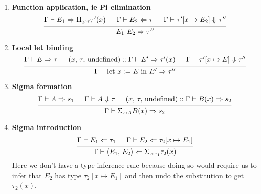 \documentclass{article}
\begin{document}
\begin{definition} 
\begin{enumerate}
    \[
      \begin{prooftree}
        \hypo{\Gamma \vdash T \Rightarrow s}
        \hypo{\Gamma \vdash T \Downarrow \tau}
        \hypo{(x, \, \tau, \, \text{undefined}) :: \Gamma \vdash E \Rightarrow \tau'(x)}
        \infer3{\Gamma \vdash \lambda \, (x : T), \, E \Rightarrow \Pi_{x : \tau}\tau'(x)}
      \end{prooftree}
    \]
    The second rule says that if the user type annotates the input argument of
    the function, then we can try to infer the type of the output and
    consequently, the type of the function as a whole.

  \item \textbf{Function application, ie Pi elimination} \\
    \[
      \begin{prooftree}
        \hypo{\Gamma \vdash E_1 \Rightarrow \Pi_{x : \tau}\tau'(x)}
        \hypo{\Gamma \vdash E_2 \Leftarrow \tau}
        \hypo{\Gamma \vdash \tau'[x \mapsto E_2] \Downarrow \tau''}
        \infer3{E_1 \,\, E_2 \Rightarrow \tau''}
      \end{prooftree}
    \]

  \item \textbf{Local let binding} \\
    \[
      \begin{prooftree}
        \hypo{\Gamma \vdash E \Rightarrow \tau}
        \hypo{(x, \, \tau, \, \text{undefined}) :: \Gamma \vdash E' \Rightarrow \tau'(x)}
        \hypo{\Gamma \vdash \tau'[x \mapsto E] \Downarrow \tau''}
        \infer3{\Gamma \vdash \text{let } x := E \text{ in } E' \Rightarrow \tau''}
      \end{prooftree}
    \]

  \item \textbf{Sigma formation} \\
    \[
      \begin{prooftree}
        \hypo{\Gamma \vdash A \Rightarrow s_1}
        \hypo{\Gamma \vdash A \Downarrow \tau}
        \hypo{(x, \, \tau, \, \text{undefined}) :: \Gamma \vdash B(x) \Rightarrow s_2}
        \infer3{\Gamma \vdash \Sigma_{x : A}B(x) \Rightarrow s_2}
      \end{prooftree}
    \]

  \item \textbf{Sigma introduction} \\
    \[
      \begin{prooftree}
        \hypo{\Gamma \vdash E_1 \Leftarrow \tau_1}
        \hypo{\Gamma \vdash E_2 \Leftarrow \tau_2[x \mapsto E_1]}
        \infer2{\Gamma \vdash \langle  E_1, \, E_2 \rangle \Leftarrow 
          \Sigma_{x : \tau_1}\tau_2(x)}
      \end{prooftree}
    \]
    Here we don't have a type inference rule because doing so would require us
    to infer that $E_2$ has type $\tau_2[x \mapsto E_1]$ and then undo the
    substitution to get $\tau_2(x)$.


\end{enumerate}
\end{definition}
\end{document}
